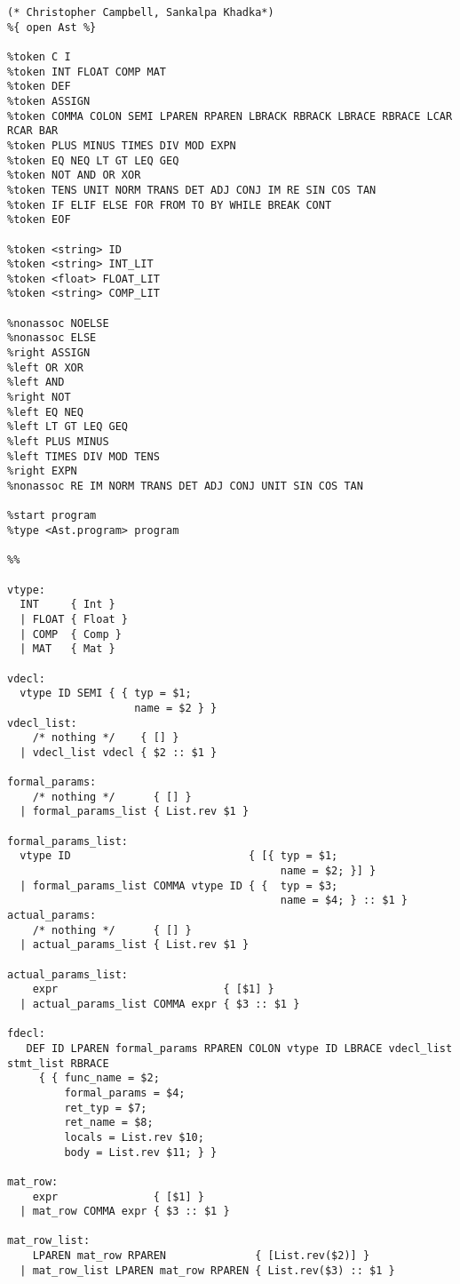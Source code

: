 \begin{lstlisting}
(* Christopher Campbell, Sankalpa Khadka*)
%{ open Ast %}

%token C I
%token INT FLOAT COMP MAT
%token DEF
%token ASSIGN
%token COMMA COLON SEMI LPAREN RPAREN LBRACK RBRACK LBRACE RBRACE LCAR RCAR BAR
%token PLUS MINUS TIMES DIV MOD EXPN
%token EQ NEQ LT GT LEQ GEQ
%token NOT AND OR XOR
%token TENS UNIT NORM TRANS DET ADJ CONJ IM RE SIN COS TAN
%token IF ELIF ELSE FOR FROM TO BY WHILE BREAK CONT
%token EOF

%token <string> ID
%token <string> INT_LIT
%token <float> FLOAT_LIT
%token <string> COMP_LIT

%nonassoc NOELSE
%nonassoc ELSE
%right ASSIGN
%left OR XOR
%left AND
%right NOT
%left EQ NEQ
%left LT GT LEQ GEQ
%left PLUS MINUS
%left TIMES DIV MOD TENS
%right EXPN
%nonassoc RE IM NORM TRANS DET ADJ CONJ UNIT SIN COS TAN

%start program
%type <Ast.program> program

%%

vtype:
  INT     { Int }
  | FLOAT { Float }
  | COMP  { Comp }
  | MAT   { Mat }

vdecl:
  vtype ID SEMI { { typ = $1;
                    name = $2 } } 
vdecl_list:
    /* nothing */    { [] }
  | vdecl_list vdecl { $2 :: $1 }

formal_params:
    /* nothing */      { [] }
  | formal_params_list { List.rev $1 }

formal_params_list:
  vtype ID                            { [{ typ = $1; 
                                           name = $2; }] }
  | formal_params_list COMMA vtype ID { {  typ = $3;
                                           name = $4; } :: $1 }
actual_params:
    /* nothing */      { [] }
  | actual_params_list { List.rev $1 }

actual_params_list:
    expr                          { [$1] }
  | actual_params_list COMMA expr { $3 :: $1 }

fdecl:
   DEF ID LPAREN formal_params RPAREN COLON vtype ID LBRACE vdecl_list stmt_list RBRACE
     { { func_name = $2;
         formal_params = $4;
         ret_typ = $7;
         ret_name = $8;
         locals = List.rev $10;
         body = List.rev $11; } }

mat_row:
    expr               { [$1] }
  | mat_row COMMA expr { $3 :: $1 }

mat_row_list:
    LPAREN mat_row RPAREN              { [List.rev($2)] }
  | mat_row_list LPAREN mat_row RPAREN { List.rev($3) :: $1 }


\end{lstlisting}
